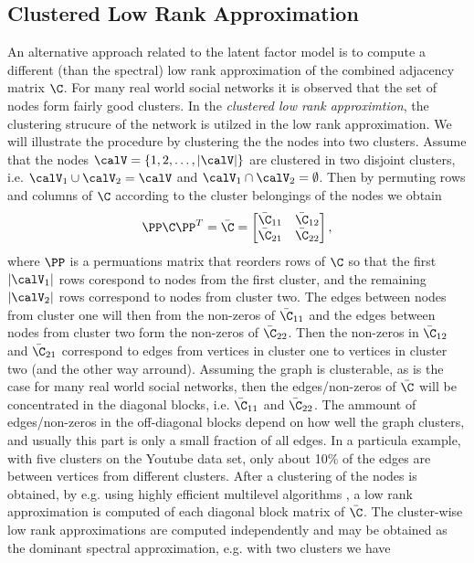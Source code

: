 \subsection{Clustered Low Rank Approximation}
An alternative approach related to the latent factor model is to compute a different (than the spectral) low rank approximation of the combined adjacency matrix $\C$. For many real world social networks it is observed that the set of nodes form fairly good clusters. In the \textit{clustered low rank approximtion}, \cite{savas10c,song10} the clustering strucure of the network is utilzed in the low rank approximation. We will illustrate the procedure by clustering the the nodes into two clusters. Assume that the nodes $\calV = \{1, 2, \dots, |\calV | \}$ are clustered in two disjoint clusters, i.e. $\calV_1 \cup \calV_2 = \calV$ and $\calV_1 \cap \calV_2 = \emptyset$. Then by permuting rows and columns of $\C$  according to the cluster belongings of the nodes we obtain 
\[
 \PP \C \PP^T = \bar{\C} = 
\begin{bmatrix}
\bar{\C}_{11} & \bar{\C}_{12} \\
\bar{\C}_{21} & \bar{\C}_{22}
\end{bmatrix},
\]
where $\PP$ is a permuations matrix that reorders rows of $\C$ so that the first $|\calV_1|$ rows corespond to nodes from the first cluster, and the remaining $|\calV_2|$ rows correspond to nodes from cluster two. The edges between nodes from cluster one will then from the non-zeros of $\bar{\C}_{11}$ and the edges between nodes from cluster two form the non-zeros of $\bar{\C}_{22}$. Then the non-zeros in $\bar{\C}_{12}$ and $\bar{\C}_{21}$ correspond to edges from vertices in cluster one to vertices in cluster two (and the other way arround). Assuming the graph is clusterable,  as is the case for many real world social networks, then the edges/non-zeros of $\bar{\C}$ will be concentrated in the diagonal blocks, i.e. $\bar{\C}_{11}$ and $\bar{\C}_{22}$. The ammount of edges/non-zeros in the off-diagonal blocks depend on how well the graph clusters, and usually this part is only a small fraction of all edges. In a particula example, with five clusters on the Youtube data set, only about 10\% of the edges are between vertices from different clusters. After a clustering of the nodes is obtained, by e.g. using highly efficient multilevel algorithms \cite{dhillon07,karypis98a}, a low rank approximation is computed of each diagonal block matrix of $\bar{\C}$.  The cluster-wise low rank approximations are computed independently and may be obtained as the dominant spectral approximation, e.g. with two clusters we have 
